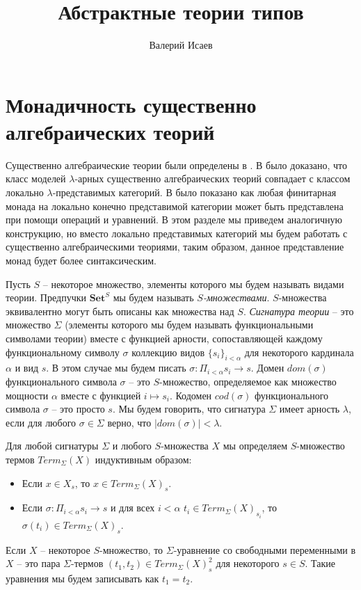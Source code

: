 \documentclass{amsart}
\theoremstyle{definition}
\theoremstyle{remark}
\newcommand{\cat}[1]{\mathbf{#1}}
\newcommand{\Set}{\cat{Set}}
\numberwithin{figure}{section}
\begin{document}
\title{Абстрактные теории типов}

\author{Валерий Исаев}


\maketitle

\section{Монадичность существенно алгебраических теорий}

Существенно алгебраические теории были определены в \cite{LPC}.
В \cite{EAT} было доказано, что класс моделей $\lambda$-арных существенно алгебраических теорий совпадает с классом локально $\lambda$-представимых категорий.
В \cite{monad-equational-presentation} было показано как любая финитарная монада на локально конечно представимой категории может быть представлена при помощи операций и уравнений.
В этом разделе мы приведем аналогичную конструкцию, но вместо локально представимых категорий мы будем работать с существенно алгебраическими теориями, таким образом, данное представление монад будет более синтаксическим.

Пусть $S$ -- некоторое множество, элементы которого мы будем называть видами теории.
Предпучки $\Set^S$ мы будем называть \emph{$S$-множествами}.
$S$-множества эквивалентно могут быть описаны как множества над $S$.
\emph{Сигнатура теории} -- это множество $\Sigma$ (элементы которого мы будем называть функциональными символами теории) вместе с функцией арности, сопоставляющей каждому функциональному символу $\sigma$ коллекцию видов $\{ s_i \}_{i < \alpha}$ для некоторого кардинала $\alpha$ и вид $s$.
В этом случае мы будем писать $\sigma : \Pi_{i < \alpha} s_i \to s$.
Домен $dom(\sigma)$ функционального символа $\sigma$ -- это $S$-множество, определяемое как множество мощности $\alpha$ вместе с функцией $i \mapsto s_i$.
Кодомен $cod(\sigma)$ функционального символа $\sigma$ -- это просто $s$.
Мы будем говорить, что сигнатура $\Sigma$ имеет арность $\lambda$, если для любого $\sigma \in \Sigma$ верно, что $|dom(\sigma)| < \lambda$.

Для любой сигнатуры $\Sigma$ и любого $S$-множества $X$ мы определяем $S$-множество термов $Term_\Sigma(X)$ индуктивным образом:
\begin{itemize}
\item Если $x \in X_s$, то $x \in Term_\Sigma(X)_s$.
\item Если $\sigma : \Pi_{i < \alpha} s_i \to s$ и для всех $i < \alpha$ $t_i \in Term_\Sigma(X)_{s_i}$, то $\sigma(t_i) \in Term_\Sigma(X)_s$.
\end{itemize}
Если $X$ -- некоторое $S$-множество, то $\Sigma$-уравнение со свободными переменными в $X$ -- это пара $\Sigma$-термов $(t_1, t_2) \in Term_\Sigma(X)^2_s$ для некоторого $s \in S$.
Такие уравнения мы будем записывать как $t_1 = t_2$.
\end{document}

